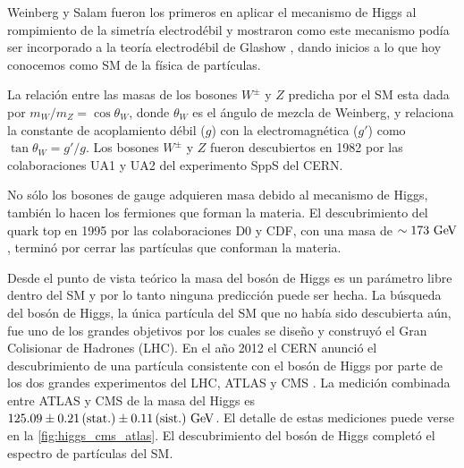 Weinberg y Salam fueron los primeros en aplicar el mecanismo de Higgs al
rompimiento de la simetría electrodébil
\cite{PhysRevLett.19.1264,PhysRev.127.965} y mostraron como este mecanismo podía
ser incorporado a la teoría electrodébil de Glashow \cite{Glashow1961579}, dando
inicios a lo que hoy conocemos como SM de la física de partículas.

La relación entre las masas de los bosones $W^\pm$ y $Z$ predicha por el SM esta
dada por $m_W/m_Z = \cos \theta_W$, donde $\theta_W$ es el ángulo de
mezcla de Weinberg, y relaciona la constante de acoplamiento débil ($g$) con la
electromagnética ($g'$) como $\tan\theta_W = g'/g$. Los bosones $W^\pm$ y $Z$
fueron descubiertos en 1982 por las colaboraciones UA1 y UA2 del experimento
SppS del CERN.

No sólo los bosones de gauge adquieren masa debido al mecanismo de Higgs,
también lo hacen los fermiones que forman la materia. El descubrimiento del
quark top en 1995 por las colaboraciones D0 y CDF, con una masa de $\sim 173
\GeV$, terminó por cerrar las partículas que conforman la materia.

Desde el punto de vista teórico la masa del bosón de Higgs es un parámetro libre
dentro del SM y por lo tanto ninguna predicción puede ser hecha. La búsqueda
del bosón de Higgs, la única partícula del SM que no había sido descubierta
aún, fue uno de los grandes objetivos por los cuales se dise\~no y construyó el
Gran Colisionar de Hadrones (LHC). En el a\~no 2012 el CERN anunció el
descubrimiento de una partícula consistente con el bosón de Higgs por parte de
los dos grandes experimentos del LHC, ATLAS y CMS
\cite{Aad:2012tfa,Chatrchyan:2012ufa}. La medición combinada entre ATLAS y CMS
de la masa del Higgs es $125.09 \pm 0.21\, \text{(stat.)} \pm 0.11\, \text{(sist.)}
\gev$\cite{HiggsMass_ATLAS_CMS}.
El detalle de estas mediciones  puede verse en la \cref{fig:higgs_cms_atlas}.
El descubrimiento del bosón de Higgs completó el espectro de partículas del SM.


